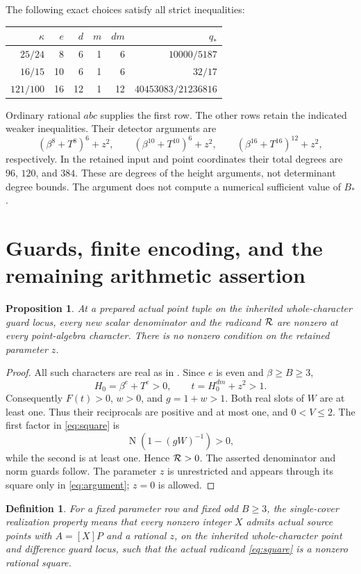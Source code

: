 \documentclass[11pt,a4paper]{article}
\newtheorem{proposition}[theorem]{Proposition}
\newtheorem{definition}[theorem]{Definition}
\DeclareMathOperator{\Nm}{N}
\begin{document}
The following exact choices satisfy all strict inequalities:
\begin{center}
\begin{tabular}{rrrrrr}\toprule
\(\kappa\)&\(e\)&\(d\)&\(m\)&\(dm\)&\(q_*\)\\\midrule
\(25/24\)&8&6&1&6&\(10000/5187\)\\
\(16/15\)&10&6&1&6&\(32/17\)\\
\(121/100\)&16&12&1&12&\(40453083/21236816\)\\\bottomrule
\end{tabular}
\end{center}
Ordinary rational \(abc\) supplies the first row. The other rows retain
the indicated weaker inequalities. Their detector arguments are
\[
 (\beta^8+T^8)^6+z^2,\qquad
 (\beta^{10}+T^{10})^6+z^2,\qquad
 (\beta^{16}+T^{16})^{12}+z^2,
\]
respectively. In the retained input and point coordinates their total
degrees are \(96\), \(120\), and \(384\). These are degrees of the
height arguments, not determinant degree bounds. The argument does
not compute a numerical sufficient value of \(B_*\).

\section{Guards, finite encoding, and the remaining arithmetic assertion}

\begin{proposition}\label{prop:guards}
At a prepared actual point tuple on the inherited whole-character
guard locus, every new scalar denominator and the radicand
\({\cal R}\) are nonzero at every point-algebra character.
There is no nonzero condition on the retained parameter \(z\).
\end{proposition}
\begin{proof}
All such characters are real as in \cite{Reweighted,Native}.
Since \(e\) is even and \(\beta\ge B\ge3\),
\[
 H_0=\beta^e+T^e>0,\qquad
 t=H_0^{dm}+z^2>1.
\]
Consequently \(F(t)>0\), \(w>0\), and \(g=1+w>1\).
Both real slots of \(W\) are at least one. Thus their reciprocals
are positive and at most one, and \(0<V\le2\).
The first factor in \eqref{eq:square} is
\[
 \Nm(1-(gW)^{-1})>0,
\]
while the second is at least one. Hence \({\cal R}>0\).
The asserted denominator and norm guards follow.
The parameter \(z\) is unrestricted and appears through its square
only in \eqref{eq:argument}; \(z=0\) is allowed.
\end{proof}

\begin{definition}\label{def:realization}
For a fixed parameter row and fixed odd \(B\ge3\), the single-cover
realization property means that every nonzero integer \(X\) admits
actual source points with \(A=[X]P\) and a rational \(z\), on the
inherited whole-character point and difference guard locus, such
that the actual radicand \eqref{eq:square} is a nonzero rational square.
\end{definition}
\end{document}
